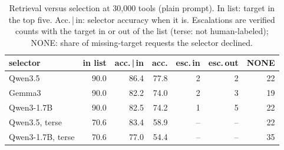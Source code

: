 \begin{table}[t]\centering\caption{Retrieval versus selection at 30,000 tools (plain prompt). In list: target in the top five. Acc.\,|\,in: selector accuracy when it is. Escalations are verified counts with the target in or out of the list (terse: not human-labeled); NONE: share of missing-target requests the selector declined.}\label{tab:split}
\footnotesize\setlength{\tabcolsep}{2.5pt}\begin{tabular}{lrrrrrr}\toprule
selector & in list & acc.\,|\,in & acc. & esc.\,in & esc.\,out & NONE\\\midrule
Qwen3.5 & 90.0 & 86.4 & 77.8 & 2 & 2 & 22 \\
Gemma3 & 90.0 & 82.2 & 74.0 & 2 & 3 & 19 \\
Qwen3-1.7B & 90.0 & 82.5 & 74.2 & 1 & 5 & 22 \\
Qwen3.5, terse & 70.6 & 83.4 & 58.9 & -- & -- & 22 \\
Qwen3-1.7B, terse & 70.6 & 77.0 & 54.4 & -- & -- & 35 \\
\bottomrule\end{tabular}\end{table}
